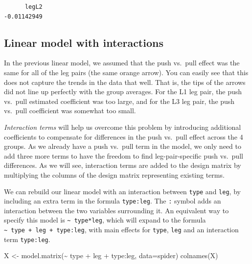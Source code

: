 \documentclass[
  letterpaper,
  DIV=11,
  numbers=noendperiod]{scrartcl}
\newenvironment{Shaded}{\begin{snugshade}}{\end{snugshade}}
\newcommand{\AttributeTok}[1]{\textcolor[rgb]{0.40,0.45,0.13}{#1}}
\newcommand{\FunctionTok}[1]{\textcolor[rgb]{0.28,0.35,0.67}{#1}}
\newcommand{\NormalTok}[1]{\textcolor[rgb]{0.00,0.23,0.31}{#1}}
\newcommand{\OtherTok}[1]{\textcolor[rgb]{0.00,0.23,0.31}{#1}}
\newcommand{\SpecialCharTok}[1]{\textcolor[rgb]{0.37,0.37,0.37}{#1}}
\begin{document}
\begin{verbatim}
      legL2 
-0.01142949 
\end{verbatim}

\subsection{Linear model with
interactions}\label{linear-model-with-interactions}

In the previous linear model, we assumed that the push vs.~pull effect
was the same for all of the leg pairs (the same orange arrow). You can
easily see that this does not capture the trends in the data that well.
That is, the tips of the arrows did not line up perfectly with the group
averages. For the L1 leg pair, the push vs.~pull estimated coefficient
was too large, and for the L3 leg pair, the push vs.~pull coefficient
was somewhat too small.

\emph{Interaction terms} will help us overcome this problem by
introducing additional coefficients to compensate for differences in the
push vs.~pull effect across the 4 groups. As we already have a push
vs.~pull term in the model, we only need to add three more terms to have
the freedom to find leg-pair-specific push vs.~pull differences. As we
will see, interaction terms are added to the design matrix by
multiplying the columns of the design matrix representing existing
terms.

We can rebuild our linear model with an interaction between
\texttt{type} and \texttt{leg}, by including an extra term in the
formula \texttt{type:leg}. The \texttt{:} symbol adds an interaction
between the two variables surrounding it. An equivalent way to specify
this model is \texttt{\textasciitilde{}\ type*leg}, which will expand to
the formula \texttt{\textasciitilde{}\ type\ +\ leg\ +\ type:leg}, with
main effects for \texttt{type}, \texttt{leg} and an interaction term
\texttt{type:leg}.

\begin{Shaded}
\begin{Highlighting}[]
\NormalTok{X }\OtherTok{\textless{}{-}} \FunctionTok{model.matrix}\NormalTok{(}\SpecialCharTok{\textasciitilde{}}\NormalTok{ type }\SpecialCharTok{+}\NormalTok{ leg }\SpecialCharTok{+}\NormalTok{ type}\SpecialCharTok{:}\NormalTok{leg, }\AttributeTok{data=}\NormalTok{spider)}
\FunctionTok{colnames}\NormalTok{(X)}
\end{Highlighting}
\end{Shaded}
\end{document}
